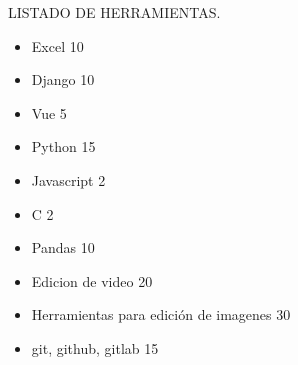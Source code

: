 LISTADO DE HERRAMIENTAS.
\begin{itemize}
\item Excel 10%
\item Django 10%
\item Vue 5%
\item Python 15%
\item Javascript 2%
\item C 2%
\item Pandas 10%
\item Edicion de video 20%
\item Herramientas para edición de imagenes 30%
\item git, github, gitlab 15%
\end{itemize}
